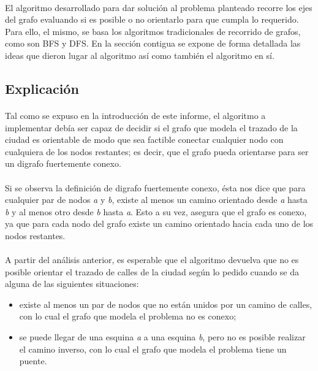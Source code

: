 \paragraph{}
El algoritmo desarrollado para dar solución al problema planteado recorre los ejes del grafo evaluando si es posible o no orientarlo para que cumpla lo requerido. Para ello, el mismo, se basa los algoritmos tradicionales de recorrido de grafos, como son BFS y DFS. En la sección contigua se expone de forma detallada las ideas que dieron lugar al algoritmo así como también el algoritmo en sí.

	
\subsection{Explicación}
\label{exp2}

\paragraph{}
Tal como se expuso en la introducción de este informe, el algoritmo a implementar debía ser capaz de decidir si el grafo que modela el trazado de la ciudad es orientable de modo que sea factible conectar cualquier nodo con cualquiera de los nodos restantes; es decir, que el grafo pueda orientarse para ser un digrafo fuertemente conexo.

\paragraph{}
Si se observa la definición de digrafo fuertemente conexo, ésta nos dice que para cualquier par de nodos \textit{a} y \textit{b}, existe al menos un camino orientado desde \textit{a} hasta \textit{b} y al menos otro desde \textit{b} hasta \textit{a}. Esto a su vez, asegura que el grafo es conexo, ya que para cada nodo del grafo existe un camino orientado hacia cada uno de los nodos restantes.

\paragraph{}
A partir del análisis anterior, es esperable que el algoritmo devuelva que no es posible orientar el trazado de calles de la ciudad según lo pedido cuando se da alguna de las siguientes situaciones: 
\begin{itemize}
	\item existe al menos un par de nodos que no están unidos por un camino de calles, con lo cual el grafo que modela el problema no es conexo;
	\item se puede llegar de una esquina \textit{a} a una esquina \textit{b}, pero no es posible realizar el camino inverso, con lo cual el grafo que modela el problema tiene un puente.
\end{itemize}

